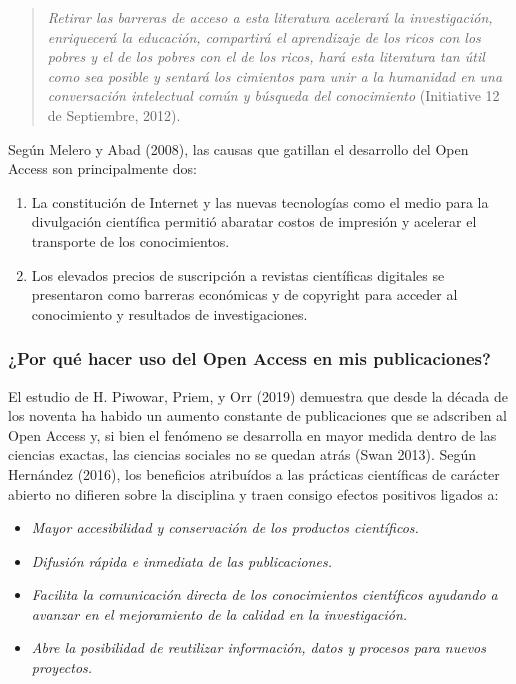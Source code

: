 \documentclass[
  spanish,
  letterpaper,
  DIV=11,
  numbers=noendperiod]{scrreprt}
\providecommand{\tightlist}{%
  \setlength{\itemsep}{0pt}\setlength{\parskip}{0pt}}
\begin{document}
\begin{quote}
\emph{Retirar las barreras de acceso a esta literatura acelerará la
investigación, enriquecerá la educación, compartirá el aprendizaje de
los ricos con los pobres y el de los pobres con el de los ricos, hará
esta literatura tan útil como sea posible y sentará los cimientos para
unir a la humanidad en una conversación intelectual común y búsqueda del
conocimiento} (Initiative 12 de Septiembre, 2012).
\end{quote}

Según Melero y Abad (2008), las causas que gatillan el desarrollo del
Open Access son principalmente dos:

\begin{enumerate}
\def\labelenumi{\arabic{enumi}.}
\item
  La constitución de Internet y las nuevas tecnologías como el medio
  para la divulgación científica permitió abaratar costos de impresión y
  acelerar el transporte de los conocimientos.
\item
  Los elevados precios de suscripción a revistas científicas digitales
  se presentaron como barreras económicas y de copyright para acceder al
  conocimiento y resultados de investigaciones.
\end{enumerate}

\subsubsection*{¿Por qué hacer uso del Open Access en mis
publicaciones?}\label{por-quuxe9-hacer-uso-del-open-access-en-mis-publicaciones}

El estudio de H. Piwowar, Priem, y Orr (2019) demuestra que desde la
década de los noventa ha habido un aumento constante de publicaciones
que se adscriben al Open Access y, si bien el fenómeno se desarrolla en
mayor medida dentro de las ciencias exactas, las ciencias sociales no se
quedan atrás (Swan 2013). Según Hernández (2016), los beneficios
atribuídos a las prácticas científicas de carácter abierto no difieren
sobre la disciplina y traen consigo efectos positivos ligados a:

\begin{itemize}
\tightlist
\item
  \emph{Mayor accesibilidad y conservación de los productos
  científicos.}
\item
  \emph{Difusión rápida e inmediata de las publicaciones.}
\item
  \emph{Facilita la comunicación directa de los conocimientos
  científicos ayudando a avanzar en el mejoramiento de la calidad en la
  investigación.}
\item
  \emph{Abre la posibilidad de reutilizar información, datos y procesos
  para nuevos proyectos.}
\end{itemize}
\end{document}
